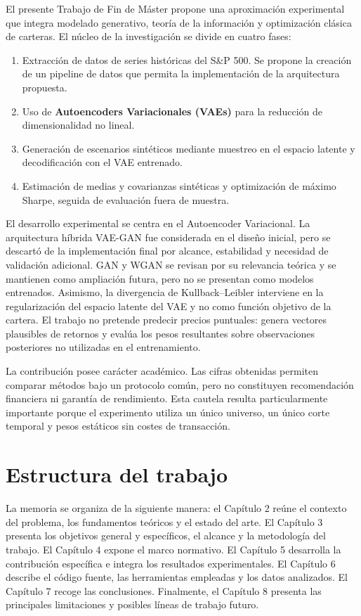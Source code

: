 El presente Trabajo de Fin de Máster propone una aproximación experimental que integra modelado generativo, teoría de la información y optimización clásica de carteras. El núcleo de la investigación se divide en cuatro fases:

\begin{enumerate}
\item Extracción de datos de series históricas del S\&P 500. Se propone la creación de un pipeline de datos que permita la implementación de la arquitectura propuesta.
\item Uso de \textbf{Autoencoders Variacionales (VAEs)} para la reducción de dimensionalidad no lineal.
\item Generación de escenarios sintéticos mediante muestreo en el espacio latente y decodificación con el VAE entrenado.
\item Estimación de medias y covarianzas sintéticas y optimización de máximo Sharpe, seguida de evaluación fuera de muestra.
\end{enumerate}

El desarrollo experimental se centra en el Autoencoder Variacional. La arquitectura híbrida VAE-GAN fue considerada en el diseño inicial, pero se descartó de la implementación final por alcance, estabilidad y necesidad de validación adicional. GAN y WGAN se revisan por su relevancia teórica y se mantienen como ampliación futura, pero no se presentan como modelos entrenados. Asimismo, la divergencia de Kullback--Leibler interviene en la regularización del espacio latente del VAE y no como función objetivo de la cartera. El trabajo no pretende predecir precios puntuales: genera vectores plausibles de retornos y evalúa los pesos resultantes sobre observaciones posteriores no utilizadas en el entrenamiento.

La contribución posee carácter académico. Las cifras obtenidas permiten comparar métodos bajo un protocolo común, pero no constituyen recomendación financiera ni garantía de rendimiento. Esta cautela resulta particularmente importante porque el experimento utiliza un único universo, un único corte temporal y pesos estáticos sin costes de transacción.

\section{Estructura del trabajo}

La memoria se organiza de la siguiente manera: el Capítulo 2 reúne el contexto del problema, los fundamentos teóricos y el estado del arte. El Capítulo 3 presenta los objetivos general y específicos, el alcance y la metodología del trabajo. El Capítulo 4 expone el marco normativo. El Capítulo 5 desarrolla la contribución específica e integra los resultados experimentales. El Capítulo 6 describe el código fuente, las herramientas empleadas y los datos analizados. El Capítulo 7 recoge las conclusiones. Finalmente, el Capítulo 8 presenta las principales limitaciones y posibles líneas de trabajo futuro.
